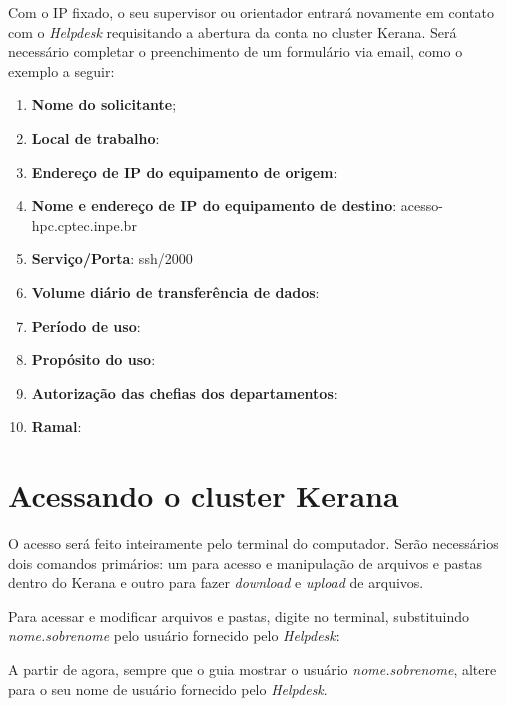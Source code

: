\noindent Com o IP fixado, o seu supervisor ou orientador entrará novamente em contato com o \textit{Helpdesk} requisitando a abertura da conta no cluster Kerana. Será necessário completar o preenchimento de um formulário via email, como o exemplo a seguir:
\bigskip
\begin{enumerate}
\item \textbf{Nome do solicitante};
\item \textbf{Local de trabalho}:
\item \textbf{Endereço de IP do equipamento de origem}:
\item \textbf{Nome e endereço de IP do equipamento de destino}: acesso-hpc.cptec.inpe.br
\item \textbf{Serviço/Porta}: ssh/2000
\item \textbf{Volume diário de transferência de dados}:
\item \textbf{Período de uso}:
\item \textbf{Propósito do uso}:
\item \textbf{Autorização das chefias dos departamentos}:
\item \textbf{Ramal}:
\end{enumerate}
\bigskip

\section{Acessando o cluster Kerana}\label{keranaacess}
\bigskip

\noindent O acesso será feito inteiramente pelo terminal do computador. Serão necessários dois comandos primários: um para acesso e manipulação de arquivos e pastas dentro do Kerana e outro para fazer \textit{download} e \textit{upload} de arquivos.
\bigskip

\noindent Para acessar e modificar arquivos e pastas, digite no terminal, substituindo \textit{nome.sobrenome} pelo usuário fornecido pelo \textit{Helpdesk}:
\bigskip

\begin{tcolorbox}[enhanced,
  grow to left by   = 0cm,
  grow to right by  = 0cm,
  enlarge top by    = 0cm,
  enlarge bottom by = 0cm,
  tcbox raise base,
  boxrule           = 1.0pt,
  left              = 18mm,
  colframe          = red!50!black,coltext=red!25!black,colback=red!10!white,
  overlay           = {\begin{tcbclipinterior}\fill[red!75!blue!50!white] (frame.south west)
    rectangle node[text=white,font=\sffamily\bfseries\footnotesize,rotate=0] {ATENÇÃO} ([xshift=18mm]frame.north west);\end{tcbclipinterior}}]
A partir de agora, sempre que o guia mostrar o usuário \textit{nome.sobrenome}, altere para o seu nome de usuário fornecido pelo \textit{Helpdesk}.
\end{tcolorbox}
\bigskip


